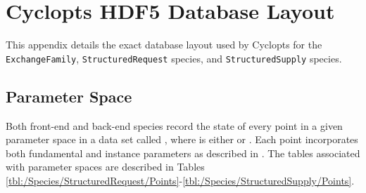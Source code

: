 \chapter{Cyclopts HDF5 Database Layout}\label{app:hdf5}

This appendix details the exact database layout used by Cyclopts for the
\texttt{ExchangeFamily}, \texttt{StructuredRequest} species, and
\texttt{StructuredSupply} species.

\section{Parameter Space}

Both front-end and back-end species record the state of every point in a given
parameter space in a data set called ,
where  is either  or
. Each point incorporates both fundamental and instance
parameters as described in . The tables associated with
parameter spaces are described in Tables
\ref{tbl:/Species/StructuredRequest/Points}-\ref{tbl:/Species/StructuredSupply/Points}.


